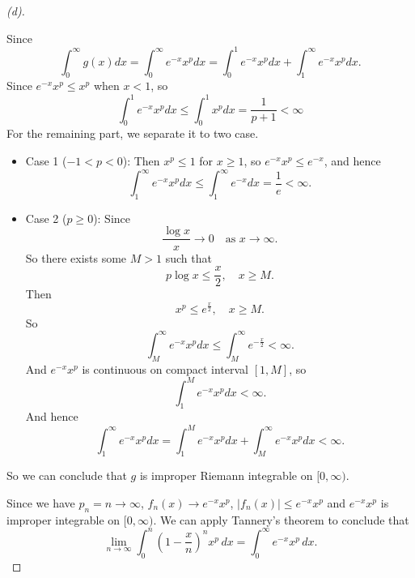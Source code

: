 \begin{proof}[(d)]
\begin{explanation}
        Since
        \[
            \int_0^\infty g(x)dx = \int_0^\infty e^{-x}x^pdx = \int_0^1 e^{-x}x^pdx + \int_1^\infty e^{-x}x^p dx.
        \]
        Since $e^{-x}x^p \le x^p$ when $x < 1$, so
        \[
            \int_0^1 e^{-x}x^pdx \le \int_0^1 x^pdx = \frac{1}{p+1} < \infty
        \]
        For the remaining part, we separate it to two case. 
        \begin{itemize}
            \item Case 1 ($-1 < p < 0$): Then $x^p \le 1$ for $x \ge 1$, so $e^{-x}x^p \le e^{-x}$, and hence
            \[
                \int_1^\infty e^{-x}x^pdx \le \int_1^\infty e^{-x}dx = \frac{1}{e} < \infty.
            \]
            \item Case 2 ($p \ge 0$): Since
            \[
                \frac{\log x}{x} \to 0 \quad \text{as } x \to \infty.
            \]
            So there exists some $M > 1$ such that 
            \[
                p \log x \le \frac{x}{2}, \quad x \ge M. 
            \]
            Then 
            \[
                x^p \le e^\frac{x}{2}, \quad x \ge M.
            \]
            So 
            \[
                \int_M^\infty e^{-x}x^pdx \le \int_M^\infty e^{-\frac{x}{2}} < \infty.
            \]
            And $e^{-x}x^p$ is continuous on compact interval $[1, M]$, so
            \[
                \int_1^M e^{-x}x^pdx < \infty.
            \]
            And hence
            \[
                \int_1^\infty e^{-x}x^pdx = \int_1^M e^{-x}x^pdx + \int_M^\infty e^{-x}x^pdx < \infty.
            \]
        \end{itemize}
        So we can conclude that $g$ is improper Riemann integrable on $[0, \infty)$.
    \end{explanation}

    Since we have $p_n = n \to \infty$, $f_n(x) \to e^{-x}x^p$, $\vert f_n(x) \vert \le e^{-x}x^p$ and $e^{-x}x^p$ is improper integrable on $[0, \infty)$. We can apply Tannery's theorem to conclude that 
    \[
    \lim_{n\to\infty}\int_0^n \left(1-\frac{x}{n}\right)^n x^p\,dx
    =
    \int_0^\infty e^{-x}x^p\,dx.
    \]
\end{proof}